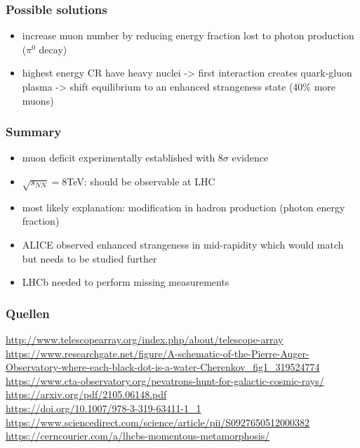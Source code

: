 \documentclass[aspectratio=1610, 9pt]{beamer}
\begin{document}

\begin{frame}\frametitle{Possible solutions}
  \begin{itemize}
    \item increase muon number by reducing energy fraction lost to photon production ($\pi^0$ decay)
    \item highest energy CR have heavy nuclei -> first interaction creates quark-gluon plasma -> shift equilibrium to an enhanced strangeness state (40\% more muons)
  \end{itemize}
\end{frame}

\begin{frame}\frametitle{Summary}
  \begin{itemize}
    \item muon deficit experimentally established with 8$\sigma$ evidence
    \item $\sqrt{s_{NN}} = 8$TeV: should be observable at LHC
    \item most likely explanation: modification in hadron production (photon energy fraction)
    \item ALICE observed enhanced strangeness in mid-rapidity which would match but needs to be studied further
    \item LHCb needed to perform missing measurements
  \end{itemize}
\end{frame}

\begin{frame}\frametitle{Quellen}
\url{http://www.telescopearray.org/index.php/about/telescope-array} \\
\url{https://www.researchgate.net/figure/A-schematic-of-the-Pierre-Auger-Observatory-where-each-black-dot-is-a-water-Cherenkov_fig1_319524774} \\
\url{https://www.cta-observatory.org/pevatrons-hunt-for-galactic-cosmic-rays/} \\
\url{https://arxiv.org/pdf/2105.06148.pdf} \\
\url{https://doi.org/10.1007/978-3-319-63411-1_1} \\
\url{https://www.sciencedirect.com/science/article/pii/S0927650512000382} \\
\url{https://cerncourier.com/a/lhcbs-momentous-metamorphosis/} \\
\end{frame}
\end{document}
